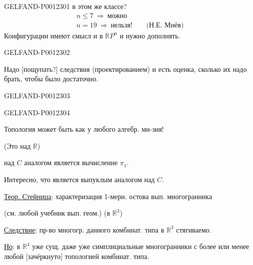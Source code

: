 \begin{GelfandAdjacentEvidence}{GELFAND-P001230}{1}
в этом же классе?
\begin{gather*}
n\le7\ \Rightarrow\ \text{можно}\\
n=19\ \Rightarrow\ \text{нельзя!}\qquad\text{(Н.Е. Мнёв)}
\end{gather*}
Конфигурации имеют смысл и в \(\mathbb RP^n\) и нужно дополнять.
\end{GelfandAdjacentEvidence}
\begin{GelfandAdjacentEvidence}{GELFAND-P001230}{2}


Надо [пощупать?] следствия (проектированием) и есть оценка, сколько их надо брать, чтобы было достаточно.
\end{GelfandAdjacentEvidence}
\begin{GelfandAdjacentEvidence}{GELFAND-P001230}{3}

\end{GelfandAdjacentEvidence}
\begin{GelfandAdjacentEvidence}{GELFAND-P001230}{4}


Топология может быть как у любого алгебр. мн-зия!

(Это над \(\mathbb R\))

над \(C\) аналогом является вычисление \(\pi_1\).

Интересно, что является выпуклым аналогом над \(C\).

\underline{Теор. Стейница}: характеризация 1-мерн. остова вып. многогранника

(см. любой учебник вып. геом.) (в \(\mathbb R^3\))

\underline{Следствие}: пр-во многогр. данного комбинат. типа в \(\mathbb R^3\) стягиваемо.

\underline{Но}: в \(\mathbb R^4\) уже сущ. даже уже симплициальные многогранники
с более или менее любой [зачёркнуто] топологией комбинат. типа.
\end{GelfandAdjacentEvidence}

